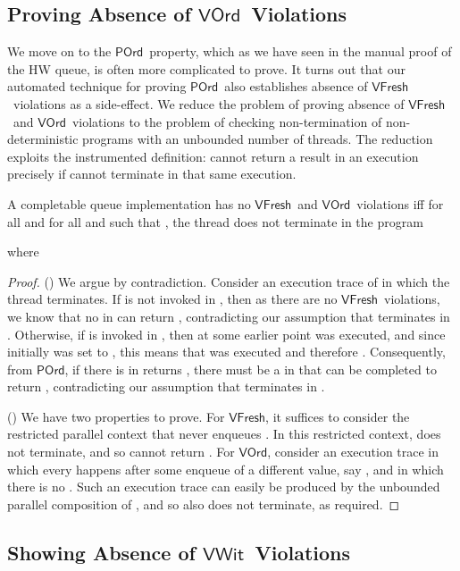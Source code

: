 \documentclass{LMCS}
\newcommand{\VFresh}{\ensuremath{\mathsf{VFresh}}}
\newcommand{\VOrd}{\ensuremath{\mathsf{VOrd}}}
\newcommand{\VWit}{\ensuremath{\mathsf{VWit}}}
\newcommand{\POrd}{\ensuremath{\mathsf{POrd}}}
\begin{document}
\subsection*{Proving Absence of \VOrd\ Violations}

We move on to the \POrd\ property, which as we have seen in the manual proof of
the HW queue, is often more complicated to prove.  It turns out that our
automated technique for proving \POrd\ also establishes absence of \VFresh\
violations as a side-effect.
We reduce the problem of proving absence of \VFresh\ and \VOrd\ violations to the
problem of checking non-termination of non-deterministic programs with an
unbounded number of threads.  The reduction exploits the instrumented
 definition:  cannot return a result  in an execution
precisely if  cannot terminate in that same execution. 

\begin{thm}\label{thm:vord}
A completable queue implementation has no \VFresh\ and \VOrd\ violations iff 
for all  and for all  and  such that , the 
thread does not terminate in the program

where

\end{thm}

\begin{proof}
()
We argue by contradiction.
Consider an execution trace  of  in which the  thread terminates.
If  is not invoked in , then as there are no \VFresh\ violations, 
we know that no  in  can return , 
contradicting our assumption that  terminates in .
Otherwise, if  is invoked in , then at some earlier point
 was executed, and since initially  was set to ,
this means that  was executed and therefore .
Consequently, from \POrd, if there is  in  returns , there must
be a  in  that can be completed to return , contradicting
our assumption that  terminates in .

() We have two properties to prove.
For \VFresh, it suffices to consider the restricted parallel context that
never enqueues . In this restricted context,
 does not terminate, and so  cannot return .
For \VOrd, consider an execution trace in which every  happens after
some enqueue of a different value, say , and in which there is no 
.  Such an execution trace can easily be produced by the unbounded parallel
composition of , and so  also does not terminate, as required.
\end{proof}


\subsection*{Showing Absence of \VWit\ Violations}
\end{document}
